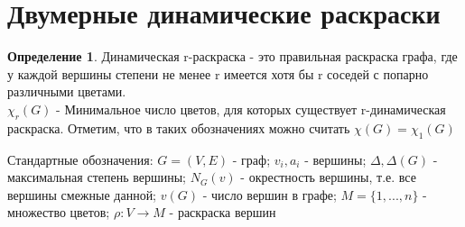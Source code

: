 \documentclass[12pt,a4paper]{article}
\theoremstyle{plain} %
\theoremstyle{definition} %
\newtheorem{definition}{Определение}[section]
\theoremstyle{remark} %
\begin{document}
	\section{Двумерные динамические раскраски}
	\begin{definition}
		Динамическая r-раскраска - это правильная раскраска графа, где у каждой вершины степени не менее r имеется хотя бы r соседей с попарно различными цветами.\\
		
		$\chi_r(G)$ - Минимальное число цветов, для которых существует r-динамическая раскраска. Отметим, что в таких обозначениях можно считать $\chi(G) = \chi_1(G)$
		
		Стандартные обозначения: $G = (V, E)$ - граф; $v_i, a_i$ - вершины; $\Delta, \Delta(G)$ - максимальная степень вершины; $N_G(v)$ - окрестность вершины, т.е. все вершины смежные данной; $v(G)$ - число вершин в графе; $M = \{1, ..., n\}$ - множество цветов; $\rho:V\rightarrow M$ - раскраска вершин
		
	\end{definition}
	
\end{document}
